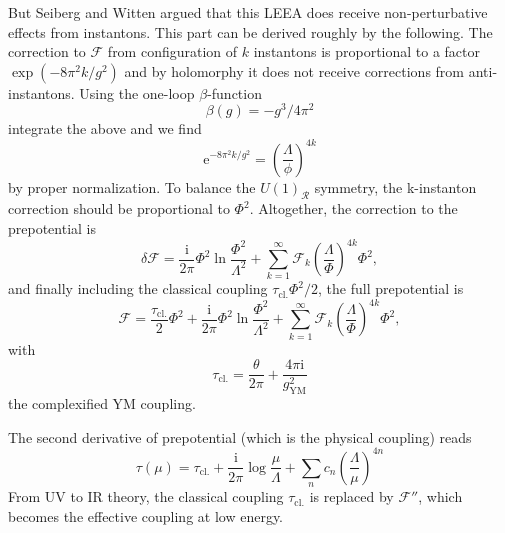 \documentclass{article}
\begin{document}
But Seiberg and Witten \cite{Sei94} argued that this LEEA does receive non-perturbative effects from instantons. This part can be derived roughly by the following. The correction to $\mathscr{F}$ from configuration of $k$ instantons is proportional to a factor $\exp(-8\pi^2k/g^2)$ and by holomorphy it does not receive corrections from anti-instantons. Using the one-loop $\beta$-function 
\begin{equation}
    \beta(g)=-g^3/4\pi^2
\end{equation}
integrate the above and we find
\begin{equation}
\mathrm{e}^{-8 \pi^{2} k / g^{2}}=\left(\frac{\Lambda}{\phi}\right)^{4 k}
\end{equation}
by proper normalization. To balance the $U(1)_{\mathscr{R}}$ symmetry, the k-instanton correction should be proportional to $\Phi^2$. Altogether, the correction to the prepotential is
\begin{equation}
\delta\mathscr{F}=\frac{\mathrm{i}}{2 \pi} \Phi^{2} \ln \frac{\Phi^{2}}{\Lambda^{2}}+\sum_{k=1}^{\infty} \mathscr{F}_{k}\left(\frac{\Lambda}{\Phi}\right)^{4 k} \Phi^{2},
\end{equation}
and finally including the classical coupling $\tau_{\mathrm{cl.}}\Phi^2/2$, the full prepotential is
\begin{equation}
\label{eq:pre}
\mathscr{F}=\frac{\tau_{\mathrm{cl.}}}{2}\Phi^2+\frac{\mathrm{i}}{2 \pi} \Phi^{2} \ln \frac{\Phi^{2}}{\Lambda^{2}}+\sum_{k=1}^{\infty} \mathscr{F}_{k}\left(\frac{\Lambda}{\Phi}\right)^{4 k} \Phi^{2},
\end{equation}
with 
\begin{equation}
   \tau_{\mathrm{cl.}}=\frac{\theta}{2\pi}+\frac{4\pi \mathrm{i}}{g_{\mathrm{YM}}^2}
\end{equation}
the complexified YM coupling.

The second derivative of prepotential (which is the physical coupling) reads
\begin{equation}
\label{eq:coupling}
    \tau(\mu)= \tau_{\mathrm{cl.}}+\frac{\mathrm{i}}{2 \pi}\log{\frac{\mu}{\Lambda}}+\sum_n c_n (\frac{\Lambda}{\mu})^{4n}
\end{equation}
From UV to IR theory, the classical coupling $\tau_{\mathrm{cl.}}$ is replaced by $\mathscr{F}''$, which becomes the effective coupling at low energy. 
\end{document}
